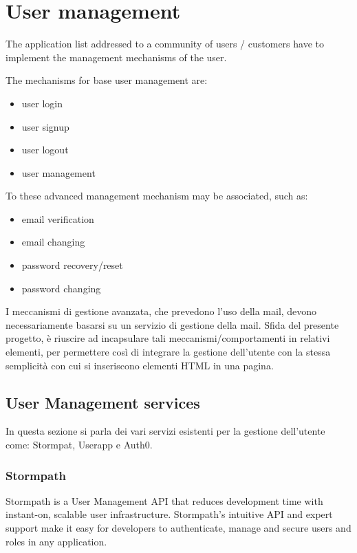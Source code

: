 \section{User management}
\label{sec:USR_user_management}

The application list addressed to a community of users / customers have to implement the management mechanisms of the user.

The mechanisms for base user management are:
\begin{itemize}
\item user login 
\item user signup
\item user logout
\item user management
\end{itemize}
To these advanced management mechanism may be associated, such as:
\begin{itemize}
\item email verification 
\item email changing  
\item password recovery/reset 
\item password changing  
\end{itemize}

I meccanismi di gestione avanzata, che prevedono l'uso della mail, devono necessariamente basarsi su un servizio di gestione della mail.
Sfida del presente progetto, è riuscire ad incapsulare tali meccanismi/comportamenti in relativi elementi, per permettere così di integrare la gestione dell'utente con la stessa semplicità con cui si inseriscono elementi HTML in una pagina.


\subsection{User Management services}
\label{subsec:USR_user_management_services}
In questa sezione si parla dei vari servizi esistenti per la gestione dell'utente come: Stormpat, Userapp e Auth0.

\subsubsection{Stormpath}

Stormpath is a User Management API that reduces development time with instant-on, scalable user infrastructure. Stormpath's intuitive API and expert support make it easy for developers to authenticate, manage and secure users and roles in any application.

